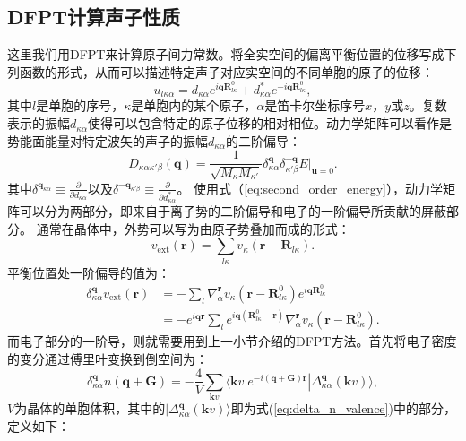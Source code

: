 \subsection{DFPT计算声子性质}
这里我们用DFPT来计算原子间力常数。将全实空间的偏离平衡位置的位移写成下列函数的形式，从而可以描述特定声子对应实空间的不同单胞的原子的位移：
\begin{equation}
  u_{l\kappa\alpha} = d_{\kappa\alpha}e^{i\bm{q}\bm{R}^0_{l\kappa}} + d^*_{\kappa\alpha}e^{-i\bm{q}\bm{R}^0_{l\kappa}},
\end{equation}
其中$l$是单胞的序号，$\kappa$是单胞内的某个原子，$\alpha$是笛卡尔坐标序号$x$，$y$或$z$。复数表示的振幅$d_{\kappa\alpha}$使得可以包含特定的原子位移的相对相位。动力学矩阵可以看作是势能面能量对特定波矢的声子的振幅$d_{\kappa\alpha}$的二阶偏导：
\begin{equation}
  D_{\kappa\alpha\kappa'\beta}(\bm{q}) =
  \frac{1}{\sqrt{M_\kappa M_{\kappa'}}} \delta^{\bm{q}}_{\kappa\alpha} \delta^{-\bm{q}}_{\kappa'\beta} E \bigg|_{\bm{u}=0}.
\end{equation}
其中$\delta^{\bm{q}_{\kappa\alpha}}\equiv \frac{\partial}{\partial d_{\kappa\alpha}}$以及$\delta^{\bm{-q}_{\kappa'\beta}}\equiv \frac{\partial}{\partial d^*_{\kappa\alpha}}$。
使用式（\ref{eq:second_order_energy}），动力学矩阵可以分为两部分，即来自于离子势的二阶偏导和电子的一阶偏导所贡献的屏蔽部分。
通常在晶体中，外势可以写为由原子势叠加而成的形式：
\begin{equation}
  v_\mathrm{ext}(\bm{r}) = \sum_{l\kappa} v_\kappa (\bm{r}-\bm{R}_{l\kappa}).
\end{equation}
平衡位置处一阶偏导的值为：
\begin{align}
  \delta^{\bm{q}}_{\kappa\alpha}v_{\mathrm{ext}}(\bm{r}) &=
  - \sum_l \nabla^{\bm{r}}_\alpha v_\kappa (\bm{r}-\bm{R}^0_{l\kappa})e^{i\bm{q}\bm{R}^0_{l\kappa}} \\
  &= -e^{i\bm{qr}} \sum_l e^{i\bm{q} (\bm{R}^0_{l\kappa}-\bm{r})} \nabla^{\bm{r}}_\alpha v_\kappa(\bm{r}-\bm{R}^0_{l\kappa}).
\end{align}
而电子部分的一阶导，则就需要用到上一小节介绍的DFPT方法。首先将电子密度的变分通过傅里叶变换到倒空间为：
\begin{equation}\label{eq:dftp_scf01}
  \delta^{\bm{q}}_{\kappa\alpha} n(\bm{q}+\bm{G}) = - \frac{4}{V}\sum_{\bm{k}v} \langle \bm{k}v| e^{-i(\bm{q}+\bm{G})\bm{r}}| \Delta^{\bm{q}}_{\kappa\alpha}(\bm{k}v) \rangle,
\end{equation}
$V$为晶体的单胞体积，其中的$|\Delta^{\bm{q}}_{\kappa\alpha}(\bm{k}v) \rangle$即为式(\ref{eq:delta_n_valence})中的部分，定义如下：

